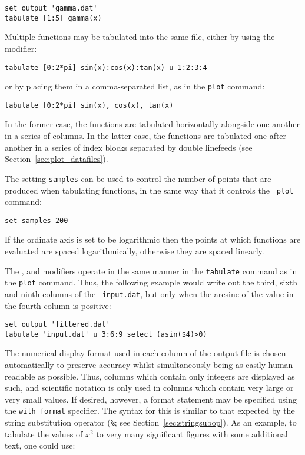 \begin{verbatim}
set output 'gamma.dat'
tabulate [1:5] gamma(x)
\end{verbatim}

\noindent Multiple functions may be tabulated into the same file, either by
using the  modifier:

\begin{verbatim}
tabulate [0:2*pi] sin(x):cos(x):tan(x) u 1:2:3:4
\end{verbatim}

\noindent or by placing them in a comma-separated list, as in the {\tt plot}
command:

\begin{verbatim}
tabulate [0:2*pi] sin(x), cos(x), tan(x)
\end{verbatim}

In the former case, the functions are tabulated horizontally alongside one
another in a series of columns. In the latter case, the functions are tabulated
one after another in a series of index blocks separated by double linefeeds
(see Section~\ref{sec:plot_datafiles}).

The setting {\tt samples} can be used to control the number of points that are
produced when tabulating functions, in the same way that it controls the {\tt
plot} command:

\begin{verbatim}
set samples 200
\end{verbatim}

\noindent If the ordinate axis is set to be logarithmic then the points at which
functions are evaluated are spaced logarithmically, otherwise they are spaced
linearly.

The ,  and  modifiers operate in
the same manner in the {\tt tabulate} command as in the {\tt plot} command.
Thus, the following example would write out the third, sixth and ninth columns
of the \datafile\ {\tt input.dat}, but only when the arcsine of the value in the
fourth column is positive:

\begin{verbatim}
set output 'filtered.dat'
tabulate 'input.dat' u 3:6:9 select (asin($4)>0)
\end{verbatim}

The numerical display format used in each column of the output file is chosen
automatically to preserve accuracy whilst simultaneously being as easily human
readable as possible.  Thus, columns which contain only integers are displayed
as such, and scientific notation is only used in columns which contain very
large or very small values.  If desired, however, a format statement may be
specified using the {\tt with format} specifier. The syntax for this is similar
to that expected by the string substitution operator ({\tt \%}; see
Section~\ref{sec:stringsubop}). As an example, to tabulate the values of $x^2$
to very many significant figures with some additional text, one could use:

